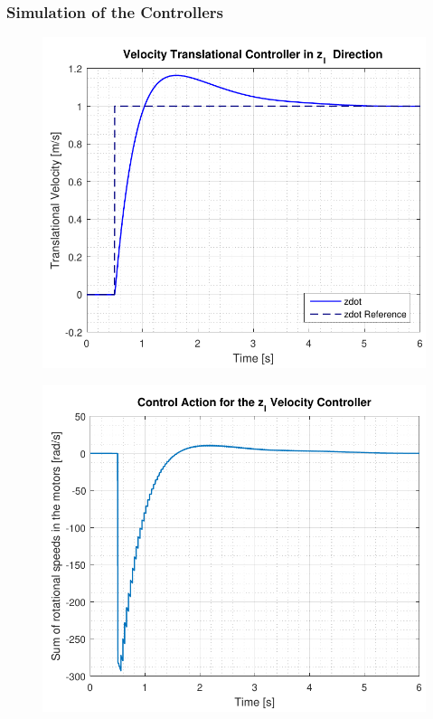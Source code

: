 \subsubsection{Simulation of the Controllers}

\begin{minipage}{\linewidth}
    \begin{minipage}{0.45\linewidth}
        \begin{figure}[H]
            \includegraphics[scale=.55]{figures/velocityControllerZ}
            \centering			
            \label{fig:velocityControllerZ}
        \end{figure}
    \end{minipage}
    \hspace{0.03\linewidth}
    \begin{minipage}{0.45\linewidth}
        \begin{figure}[H]
            \includegraphics[scale=.55]{figures/velocityControllerZAction}

\end{figure}
\end{minipage}
\end{minipage}
